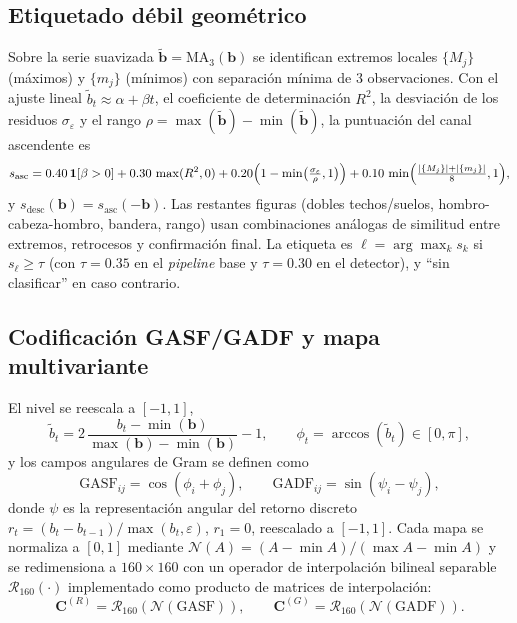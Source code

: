 \documentclass[11pt,a4paper]{article}
\begin{document}
\subsection{Etiquetado débil geométrico}
\label{ap:etiquetado}
Sobre la serie suavizada $\tilde{\mathbf{b}} = \mathrm{MA}_3(\mathbf{b})$ se
identifican extremos locales $\{M_j\}$ (máximos) y $\{m_j\}$ (mínimos) con
separación mínima de 3 observaciones. Con el ajuste lineal
$\tilde b_t \approx \alpha + \beta t$, el coeficiente de determinación $R^2$, la
desviación de los residuos $\sigma_\varepsilon$ y el rango
$\rho = \max(\tilde{\mathbf{b}})-\min(\tilde{\mathbf{b}})$, la puntuación del
canal ascendente es
\begin{equation}
s_{\mathrm{asc}} = 0.40\,\mathbf{1}[\beta>0]
 + 0.30\,\max(R^2,0)
 + 0.20\Bigl(1-\min\bigl(\tfrac{\sigma_\varepsilon}{\rho},1\bigr)\Bigr)
 + 0.10\,\min\Bigl(\tfrac{|\{M_j\}|+|\{m_j\}|}{8},1\Bigr),
\end{equation}
y $s_{\mathrm{desc}}(\mathbf{b}) = s_{\mathrm{asc}}(-\mathbf{b})$. Las restantes
figuras (dobles techos/suelos, hombro-cabeza-hombro, bandera, rango) usan
combinaciones análogas de similitud entre extremos, retrocesos y confirmación
final. La etiqueta es $\ell = \arg\max_k s_k$ si
$s_{\ell} \geq \tau$ (con $\tau=0.35$ en el \emph{pipeline} base y $\tau=0.30$
en el detector), y ``sin clasificar'' en caso contrario.

\subsection{Codificación GASF/GADF y mapa multivariante}
\label{ap:encoding}
El nivel se reescala a $[-1,1]$,
\begin{equation}
\tilde b_t = 2\,\frac{b_t - \min(\mathbf{b})}{\max(\mathbf{b}) - \min(\mathbf{b})} - 1,
\qquad \phi_t = \arccos(\tilde b_t)\in[0,\pi],
\end{equation}
y los campos angulares de Gram se definen como \cite{wang2015imaging}
\begin{equation}
\mathrm{GASF}_{ij} = \cos(\phi_i + \phi_j), \qquad
\mathrm{GADF}_{ij} = \sin(\psi_i - \psi_j),
\end{equation}
donde $\psi$ es la representación angular del retorno discreto
$r_t = (b_t - b_{t-1})/\max(b_t,\varepsilon)$, $r_1=0$, reescalado a $[-1,1]$.
Cada mapa se normaliza a $[0,1]$ mediante
$\mathcal{N}(A) = (A - \min A)/(\max A - \min A)$ y se redimensiona a
$160\times160$ con un operador de interpolación bilineal separable
$\mathcal{R}_{160}(\cdot)$ implementado como producto de matrices de
interpolación:
\begin{equation}
\mathbf{C}^{(R)} = \mathcal{R}_{160}(\mathcal{N}(\mathrm{GASF})), \qquad
\mathbf{C}^{(G)} = \mathcal{R}_{160}(\mathcal{N}(\mathrm{GADF})).
\end{equation}
\end{document}

